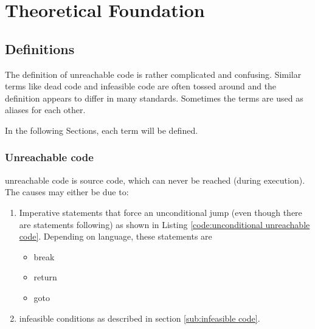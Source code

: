 
\chapter {Theoretical Foundation}
\label {cha:theoretical foundation}

\section{Definitions}
\label{sec:definitions}

The definition of unreachable code is rather complicated and confusing. 
Similar terms like dead code and infeasible code are often tossed around and the definition appears to differ in many standards. 
Sometimes the terms are used as aliases for each other.


In the following Sections, each term will be defined.

\subsection{Unreachable code}
\label{sub:unreachable code}
unreachable code is source code, which can never be reached (during execution). 
The causes may either be due to:
\begin{enumerate}
	\item Imperative statements that force an unconditional jump (even though there are statements following) as shown in Listing \ref{code:unconditional unreachable code}. Depending on language, these statements are 
	\begin{itemize}
		\item break
		\item return
		\item goto
	\end{itemize}
	\item infeasible conditions as described in section \ref{sub:infeasible code}. 
\end{enumerate}


